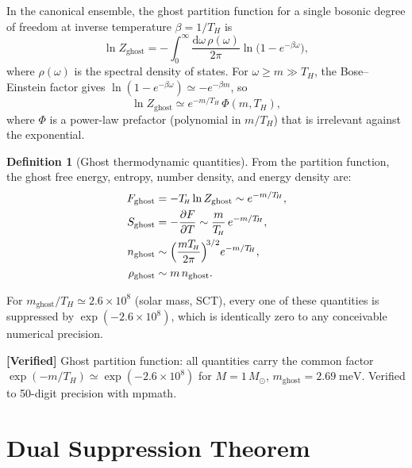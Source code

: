 \documentclass[11pt,a4paper]{article}
\newcommand{\dd}{\mathrm{d}}
\newcommand{\Msun}{M_{\odot}}
\newcommand{\mghost}{m_{\mathrm{ghost}}}
\newcommand{\Thr}{T_{\!\scriptscriptstyle H}}
\theoremstyle{plain}
\theoremstyle{definition}
\newtheorem{definition}[theorem]{Definition}
\newcommand{\verified}[1]{%
  \par\smallskip\noindent
  \colorbox{green!10}{\parbox{\dimexpr\linewidth-2\fboxsep}{%
    \textcolor{green!50!black}{\textbf{[Verified]}} #1}}%
  \par\smallskip}
\begin{document}
In the canonical ensemble, the ghost partition function for a single
bosonic degree of freedom at inverse temperature $\beta = 1/\Thr$ is
\begin{equation}\label{eq:Z}
  \ln Z_{\mathrm{ghost}}
  = -\int_0^\infty \frac{\dd\omega\,\rho(\omega)}{2\pi}
    \ln\!\bigl(1 - e^{-\beta\omega}\bigr),
\end{equation}
where $\rho(\omega)$ is the spectral density of states.  For
$\omega \geq m \gg \Thr$, the Bose--Einstein factor gives
$\ln(1-e^{-\beta\omega}) \simeq -e^{-\beta m}$, so
\begin{equation}\label{eq:Z_approx}
  \ln Z_{\mathrm{ghost}}
  \simeq e^{-m/\Thr}\,\Phi(m,\Thr),
\end{equation}
where $\Phi$ is a power-law prefactor (polynomial in $m/\Thr$) that
is irrelevant against the exponential.

\begin{definition}[Ghost thermodynamic quantities]\label{def:ghost_thermo}
  From the partition function, the ghost free energy, entropy, number
  density, and energy density are:
  \begin{align}
    F_{\mathrm{ghost}} &= -\Thr\ln Z_{\mathrm{ghost}}
    \sim e^{-m/\Thr},\label{eq:F_ghost}\\
    S_{\mathrm{ghost}} &= -\frac{\partial F}{\partial T}
    \sim \frac{m}{\Thr}\,e^{-m/\Thr},\label{eq:S_ghost}\\
    n_{\mathrm{ghost}} &\sim
    \Bigl(\frac{m\Thr}{2\pi}\Bigr)^{\!3/2}e^{-m/\Thr},
    \label{eq:n_ghost}\\
    \rho_{\mathrm{ghost}} &\sim m\,n_{\mathrm{ghost}}.
    \label{eq:rho_ghost}
  \end{align}
\end{definition}

For $\mghost/\Thr \simeq 2.6\times 10^{8}$ (solar mass, SCT), every
one of these quantities is suppressed by
$\exp(-2.6\times 10^{8})$, which is identically zero to any
conceivable numerical precision.

\verified{Ghost partition function: all quantities carry the common
factor $\exp(-m/\Thr) \simeq \exp(-2.6\times 10^{8})$ for
$M = 1\,\Msun$, $\mghost = 2.69\;\mathrm{meV}$.  Verified to
50-digit precision with mpmath.}


\section{Dual Suppression Theorem}\label{sec:dual}
\end{document}
